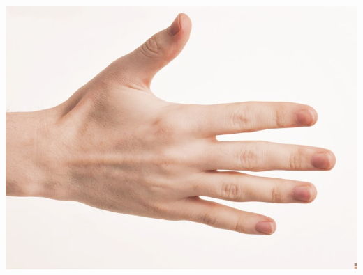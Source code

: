   \begin{minipage}{.29\textwidth}
    \includegraphics[width=\textwidth,height=\textheight,keepaspectratio]{../rc_test/outputs/20170524_prop_corr_1p1_ave_25/hand_pale_to_hand_light.jpg}
  \end{minipage} \\
\hline